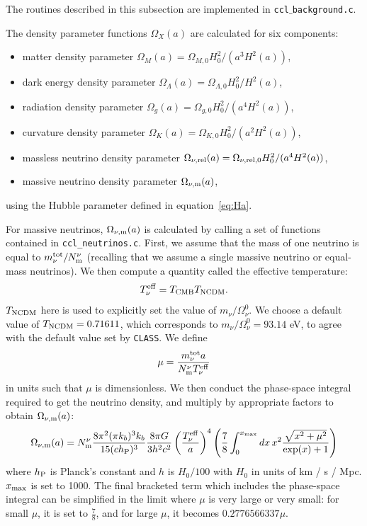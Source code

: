\documentclass[\docopts]{\docclass}
\begin{document}
The routines described in this subsection are implemented in {\tt ccl$\_$background.c}.

The density parameter functions $\Omega_X(a)$ are calculated for six components:
\begin{itemize}
\item matter density parameter $\Omega_M(a) = \Omega_{M,0} H_0^2 / (a^3 H^2(a) )$,
\item dark energy density parameter $\Omega_\Lambda(a) = \Omega_{\Lambda,0} H_0^2 / H^2(a)$,
\item radiation density parameter $\Omega_g(a) = \Omega_{g,0} H_0^2 / (a^4 H^2(a) )$,
\item curvature density parameter $\Omega_K(a) = \Omega_{K,0} H_0^2 / (a^2 H^2(a) )$,
\item massless neutrino density parameter $\Omega_{\nu, {\rm rel}}(a) = \Omega_{\nu, {\rm rel},0} H_0^2 / (a^4 H^2(a) )$,
\item massive neutrino density parameter $\Omega_{\nu, {\rm m}}(a)$,
\end{itemize}
using the Hubble parameter defined in equation~\ref{eq:Ha}.

For massive neutrinos, $\Omega_{\nu, {\rm m}}(a)$ is calculated by calling a set of functions contained in {\tt ccl\_neutrinos.c}. First, we assume that the mass of one neutrino is equal to $m_{\nu}^{\rm tot} / N_{\rm m}^{\nu}$ (recalling that we assume a single massive neutrino or equal-mass neutrinos). We then compute a quantity called the effective temperature:
\begin{equation}
T_{\nu}^{\rm eff} = T_{\rm CMB} T_{\rm NCDM}.
\label{Tnueff}
\end{equation}
$T_{\rm NCDM}$ here is used to explicitly set the value of $m_{\nu} / \Omega_{\nu}^0$. We choose a default value of $T_{\rm NCDM} = 0.71611$, which corresponds to $m_{\nu} / \Omega_{\nu}^0 = 93.14$ eV, to agree with the default value set by {\tt CLASS}. We define 
\begin{equation}
\mu = \frac{m_{\nu}^{\rm tot}a}{N_{\rm m}^\nu T_{\nu}^{\rm eff}}
\label{mnuOT}
\end{equation}
in units such that $\mu$ is dimensionless. We then conduct the phase-space integral required to get the neutrino density, and multiply by appropriate factors to obtain $\Omega_{\nu, {\rm m}}(a)$:
\begin{equation}
\Omega_{\nu, {\rm m}}(a) = N_{\rm m}^\nu \frac{8 \pi^2(\pi k_b )^3 k_b}{15(c h_{\rm P})^3} \frac{8 \pi G}{3h^2c^2} \left(\frac{T_{\nu}^{\rm eff}}{a}\right)^4 \left(\frac{7}{8}\int_0^{x_{\rm max}} dx \, x^2 \frac{\sqrt{x^2 + \mu^2}}{\exp(x) + 1}\right)
\label{Omnu}
\end{equation}
where $h_{\rm P}$ is Planck's constant and $h$ is $H_0/100$ with $H_0$ in units of km / s / Mpc. $x_{\rm max}$ is set to 1000. The final bracketed term which includes the phase-space integral can be simplified in the limit where $\mu$ is very large or very small: for small $\mu$, it is set to $\frac{7}{8}$, and for large $\mu$, it becomes $0.2776566337\mu$.
\end{document}
